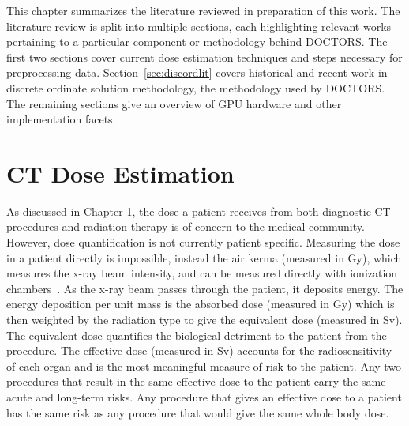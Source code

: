 
This chapter summarizes the literature reviewed in preparation of this work. The literature review is split into multiple sections, each highlighting relevant works pertaining to a particular component or methodology behind DOCTORS. The first two sections cover current dose estimation techniques and steps necessary for preprocessing data. Section~\ref{sec:discordlit} covers historical and recent work in discrete ordinate solution methodology, the methodology used by DOCTORS. The remaining sections give an overview of GPU hardware and other implementation facets.

\section{CT Dose Estimation}
As discussed in Chapter 1, the dose a patient receives from both diagnostic CT procedures and radiation therapy is of concern to the medical community. However, dose quantification is not currently patient specific. Measuring the dose in a patient directly is impossible, instead the air kerma (measured in Gy), which measures the x-ray beam intensity, and can be measured directly with ionization chambers~\citep{ref:wolbarsta}. As the x-ray beam passes through the patient, it deposits energy. The energy deposition per unit mass is the absorbed dose (measured in Gy) which is then weighted by the radiation type to give the equivalent dose (measured in Sv). The equivalent dose quantifies the biological detriment to the patient from the procedure. The effective dose (measured in Sv) accounts for the radiosensitivity of each organ and is the most meaningful measure of risk to the patient. Any two procedures that result in the same effective dose to the patient carry the same acute and long-term risks. Any procedure that gives an effective dose to a patient has the same risk as any procedure that would give the same whole body dose.

